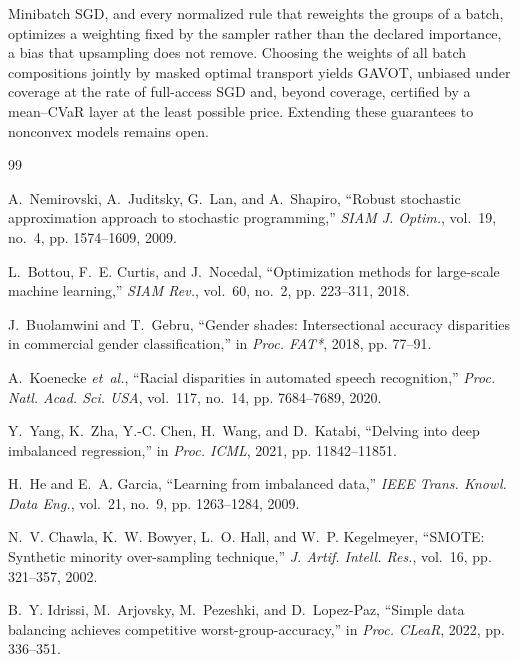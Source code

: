 \documentclass{article}
\theoremstyle{definition}
\newcommand{\avot}{\textsf{GAVOT}}
\begin{document}
Minibatch SGD, and every normalized rule that reweights the groups of a
batch, optimizes a weighting fixed by the sampler rather than the
declared importance, a bias that upsampling does not remove. Choosing the weights of all batch compositions
jointly by masked optimal transport yields \avot{}, unbiased under
coverage at the rate of full-access SGD and, beyond coverage, certified
by a mean--CVaR layer at the least possible price. Extending these
guarantees to nonconvex models remains open.


\clearpage

\renewcommand{\refname}{REFERENCES}

\balance
\begin{thebibliography}{99}\setlength{\itemsep}{-2.5pt}\small

A.~Nemirovski, A.~Juditsky, G.~Lan, and A.~Shapiro, ``Robust stochastic
approximation approach to stochastic programming,'' \emph{SIAM J. Optim.},
vol.~19, no.~4, pp. 1574--1609, 2009.

L.~Bottou, F.~E. Curtis, and J.~Nocedal, ``Optimization methods for
large-scale machine learning,'' \emph{SIAM Rev.}, vol.~60, no.~2,
pp. 223--311, 2018.

J.~Buolamwini and T.~Gebru, ``Gender shades: Intersectional accuracy
disparities in commercial gender classification,'' in \emph{Proc. FAT*},
2018, pp. 77--91.

A.~Koenecke \emph{et~al.}, ``Racial disparities in automated speech
recognition,'' \emph{Proc. Natl. Acad. Sci. USA}, vol.~117, no.~14,
pp. 7684--7689, 2020.

Y.~Yang, K.~Zha, Y.-C. Chen, H.~Wang, and D.~Katabi, ``Delving into deep
imbalanced regression,'' in \emph{Proc. ICML}, 2021, pp. 11842--11851.

H.~He and E.~A. Garcia, ``Learning from imbalanced data,'' \emph{IEEE
Trans. Knowl. Data Eng.}, vol.~21, no.~9, pp. 1263--1284, 2009.

N.~V. Chawla, K.~W. Bowyer, L.~O. Hall, and W.~P. Kegelmeyer, ``SMOTE:
Synthetic minority over-sampling technique,'' \emph{J. Artif. Intell.
Res.}, vol.~16, pp. 321--357, 2002.

B.~Y. Idrissi, M.~Arjovsky, M.~Pezeshki, and D.~Lopez-Paz, ``Simple data
balancing achieves competitive worst-group-accuracy,'' in \emph{Proc.
CLeaR}, 2022, pp. 336--351.


\end{thebibliography}
\end{document}
